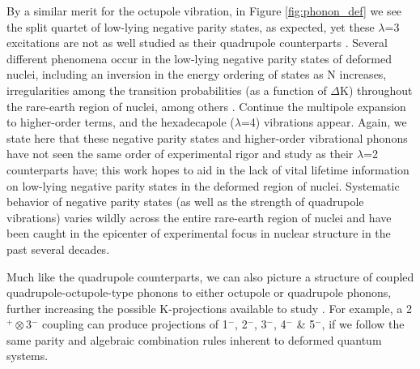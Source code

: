 By a similar merit for the octupole vibration, in Figure \ref{fig:phonon_def} we see the split quartet of low-lying negative parity states, as expected, yet these $\lambda$=3 excitations are not as well studied as their quadrupole counterparts \cite{Casten_text}. Several different phenomena occur in the low-lying negative parity states of deformed nuclei, including an inversion in the energy ordering of states as N increases, irregularities among the transition probabilities (as a function of $\Delta$K) throughout the rare-earth region of nuclei, among others \cite{Borner_collective1999,Casten_text}. Continue the multipole expansion to higher-order terms, and the hexadecapole ($\lambda$=4) vibrations appear. Again, we state here that these negative parity states and higher-order vibrational phonons have not seen the same order of experimental rigor and study as their $\lambda$=2 counterparts have; this work hopes to aid in the lack of vital lifetime information on low-lying negative parity states in the deformed region of nuclei. Systematic behavior of negative parity states (as well as the strength of quadrupole vibrations) varies wildly across the entire rare-earth region of nuclei and have been caught in the epicenter of experimental focus in nuclear structure in the past several decades. 

Much like the quadrupole counterparts, we can also picture a structure of coupled quadrupole-octupole-type phonons to either octupole or quadrupole phonons, further increasing the possible K-projections available to study \cite{Pascu_octupole_2015}. For example, a 2$^+\otimes$3$^-$ coupling can produce projections of 1$^-$, 2$^-$, 3$^-$, 4$^-$ \& 5$^-$, if we follow the same parity and algebraic combination rules inherent to deformed quantum systems. 





